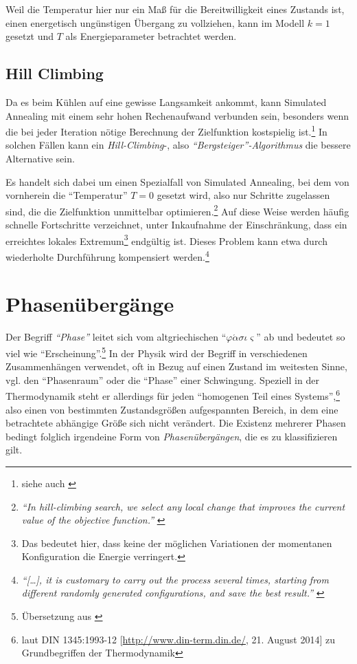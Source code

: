 \documentclass[a4paper, 10pt, twoside, openany]{book} %
\def \phi {\varphi}
\begin{document}
Weil die Temperatur hier nur ein Maß für die Bereitwilligkeit eines Zustands ist, einen energetisch ungünstigen Übergang zu vollziehen, kann im Modell $k = 1$ gesetzt und $T$ als Energieparameter betrachtet werden.

\subsection{Hill Climbing}
\label{Hill Climbing}

Da es beim Kühlen auf eine gewisse Langsamkeit ankommt, kann Simulated Annealing mit einem sehr hohen Rechenaufwand verbunden sein, besonders wenn die bei jeder Iteration nötige Berechnung der Zielfunktion kostspielig ist.\footnote{siehe auch \cite[S.~139]{vanLaarhoven}} In solchen Fällen kann ein \emph{Hill-Climbing}-, also \emph{"`Bergsteiger"'-Algorithmus} die bessere Alternative sein.

Es handelt sich dabei um einen Spezialfall von Simulated Annealing, bei dem von vornherein die "`Temperatur"' $T = 0$ gesetzt wird, also nur Schritte zugelassen sind, die die Zielfunktion unmittelbar optimieren.\footnote{\emph{"`In hill-climbing search, we select any local change that improves the current value of the objective function."'} \cite[S.~334]{Selman}} Auf diese Weise werden häufig schnelle Fortschritte verzeichnet, unter Inkaufnahme der Einschränkung, dass ein erreichtes lokales Extremum\footnote{Das bedeutet hier, dass keine der möglichen Variationen der momentanen Konfiguration die Energie verringert.} endgültig ist. Dieses Problem kann etwa durch wiederholte Durchführung kompensiert werden.\footnote{\emph{"`\emph{[\dots]}, it is customary to carry out the process several times, starting from different randomly generated configurations, and save the best result."'} \cite[S.~672]{Kirkpatrick}}

\section{Phasenübergänge}

Der Begriff \emph{"`Phase"'} leitet sich vom altgriechischen "`$\phi \acute \alpha \sigma \iota \varsigma$"' ab und bedeutet so viel wie "`Erscheinung"'.\footnote{Übersetzung aus \cite[S.~778]{Schmidt}} In der Physik wird der Begriff in verschiedenen Zusammenhängen verwendet, oft in Bezug auf einen Zustand im weitesten Sinne, vgl. den "`Phasenraum"' oder die "`Phase"' einer Schwingung. Speziell in der Thermodynamik steht er allerdings für jeden "`homogenen Teil eines Systems"',\footnote{laut DIN 1345:1993-12 [\url{http://www.din-term.din.de/}, 21. August 2014] zu Grundbegriffen der Thermodynamik} also einen von bestimmten Zustandsgrößen aufgespannten Bereich, in dem eine betrachtete abhängige Größe sich nicht verändert. Die Existenz mehrerer Phasen bedingt folglich irgendeine Form von \emph{Phasenübergängen}, die es zu klassifizieren gilt.
\end{document}
